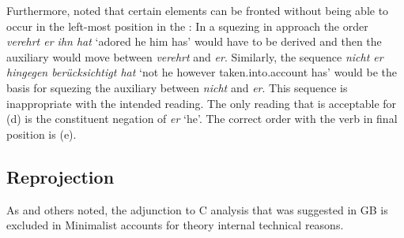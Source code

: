{{Furthermore, \citet[Section~2.2]{Reis80a} noted that certain elements can be fronted without being able to occur
in the left-most position in the \mf:
\eal
{}
\zl
In a squezing in approach the order \emph{verehrt er ihn hat} `adored he him has' would have to be derived and then the
auxiliary would move between \emph{verehrt} and \emph{er}. Similarly, the sequence \emph{nicht er
  hingegen berücksichtigt hat} `not he however taken.into.account has' would be the basis for
squezing the auxiliary between \emph{nicht} and \emph{er}. This sequence is inappropriate with the
intended reading. The only reading that is acceptable for (d) is the constituent negation of
\emph{er} `he'. The correct order with the verb in final position is (e).


\subsection{Reprojection}

As \citet[]{Fanselow2009b} and others noted, the adjunction to C analysis that
was suggested in GB is excluded in Minimalist accounts for theory internal technical reasons.

}}
